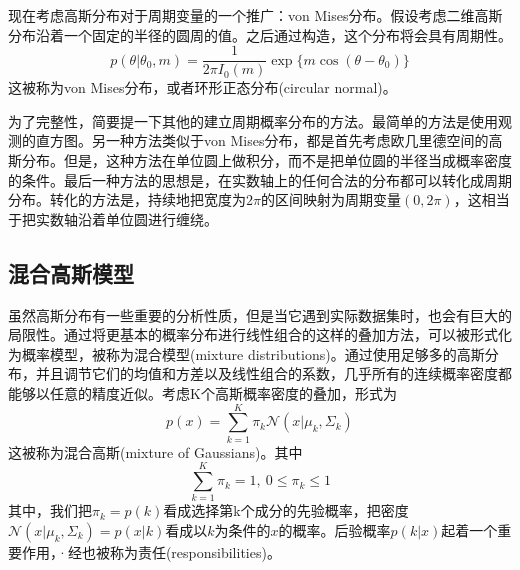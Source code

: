现在考虑高斯分布对于周期变量的一个推广：von Mises分布。假设考虑二维高斯分布沿着一个固定的半径的圆周的值。之后通过构造，这个分布将会具有周期性。
\begin{equation}
	p(\theta|\theta_0,m)=\frac{1}{2\pi I_0(m)}\exp\{m\cos (\theta -\theta_0) \}
\end{equation}
这被称为von Mises分布，或者环形正态分布(circular normal)。

为了完整性，简要提一下其他的建立周期概率分布的方法。最简单的方法是使用观测的直方图。另一种方法类似于von Mises分布，都是首先考虑欧几里德空间的高斯分布。但是，这种方法在单位圆上做积分，而不是把单位圆的半径当成概率密度的条件。最后一种方法的思想是，在实数轴上的任何合法的分布都可以转化成周期分布。转化的方法是，持续地把宽度为$2\pi$的区间映射为周期变量$(0,2\pi)$，这相当于把实数轴沿着单位圆进行缠绕。
\subsection*{混合高斯模型}
虽然高斯分布有一些重要的分析性质，但是当它遇到实际数据集时，也会有巨大的局限性。通过将更基本的概率分布进行线性组合的这样的叠加方法，可以被形式化为概率模型，被称为混合模型(mixture distributions)。通过使用足够多的高斯分布，并且调节它们的均值和方差以及线性组合的系数，几乎所有的连续概率密度都能够以任意的精度近似。考虑K个高斯概率密度的叠加，形式为
\begin{equation}
	p(x)=\sum_{k=1}^{K}\pi_k\mathcal{N}(x|\mu_k,\Sigma_k)
\end{equation}
这被称为混合高斯(mixture of Gaussians)。其中
\begin{equation}
	\sum_{k=1}^{K}\pi_k=1,\ 0\leqslant \pi_k \leqslant 1
\end{equation}
其中，我们把$\pi_k=p(k)$看成选择第k个成分的先验概率，把密度$\mathcal{N}(x|\mu_k,\Sigma_k)=p(x|k)$看成以$k$为条件的$x$的概率。后验概率$p(k|x)$起着一个重要作用，·经也被称为责任(responsibilities)。